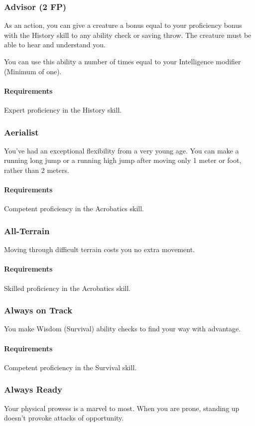 \subsubsection{Advisor (2 FP)} \label{feat::advisor}
    As an action, you can give a creature a bonus equal to your proficiency bonus with the History skill to any ability check or saving throw.
    The creature must be able to hear and understand you.

    You can use this ability a number of times equal to your Intelligence modifier (Minimum of one).
    \paragraph{Requirements} Expert proficiency in the History skill.
\subsubsection{Aerialist} \label{feat::aerialist}
    You've had an exceptional flexibility from a very young age.
    You can make a running long jump or a running high jump after moving only 1 meter or foot, rather than 2 meters.
    \paragraph{Requirements} Competent proficiency in the Acrobatics skill.
\subsubsection{All-Terrain} \label{feat::allterrain}
    Moving through difficult terrain costs you no extra movement.
    \paragraph{Requirements} Skilled proficiency in the Acrobatics skill.
\subsubsection{Always on Track} \label{feat::alwaysontrack}
    You make Wisdom (Survival) ability checks to find your way with advantage.
    \paragraph{Requirements} Competent proficiency in the Survival skill.
\subsubsection{Always Ready} \label{feat::alwaysready}
    Your physical prowess is a marvel to most.
    When you are prone, standing up doesn't provoke attacks of opportunity.
